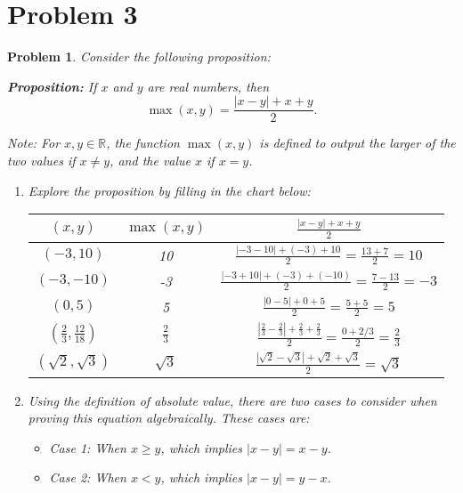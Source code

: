 \documentclass[12pt]{article}
\newtheorem{problem}{Problem}
\theoremstyle{definition}
\begin{document}
\bigskip

\section*{Problem 3}

\begin{problem}
Consider the following proposition:

\textbf{Proposition:} If \( x \) and \( y \) are real numbers, then
\[
\max(x, y) = \frac{|x - y| + x + y}{2}.
\]

Note: For \( x, y \in \mathbb{R} \), the function \( \max(x, y) \) is defined to output the larger of the two values if \( x \neq y \), and the value \( x \) if \( x = y \).

\begin{enumerate}[label=(\alph*)]

\item Explore the proposition by filling in the chart below:

\begin{center}
    \begin{tabular}{|c|c|c|}
    \hline
    \( (x, y) \) & \( \max(x, y) \) & \( \frac{|x - y| + x + y}{2} \) \\
    \hline
    \( (-3, 10) \) & 10 & \( \frac{| -3 - 10 | + (-3) + 10}{2} = \frac{13 + 7}{2} = 10 \) \\
    \( (-3, -10) \) & -3 & \( \frac{| -3 + 10 | + (-3) + (-10)}{2} = \frac{7 - 13}{2} = -3 \) \\
    \( (0, 5) \) & 5 & \( \frac{| 0 - 5 | + 0 + 5}{2} = \frac{5 + 5}{2} = 5 \) \\
    \( \left(\frac{2}{3}, \frac{12}{18}\right) \) & \( \frac{2}{3} \) & \( \frac{\left| \frac{2}{3} - \frac{2}{3} \right| + \frac{2}{3} + \frac{2}{3}}{2} = \frac{0 + 2/3}{2} = \frac{2}{3} \) \\
    \( (\sqrt{2}, \sqrt{3}) \) & \( \sqrt{3} \) & \( \frac{| \sqrt{2} - \sqrt{3} | + \sqrt{2} + \sqrt{3}}{2} = \sqrt{3} \) \\
    \hline
    \end{tabular}
\end{center}

\item Using the definition of absolute value, there are two cases to consider when proving this equation algebraically. These cases are:

\begin{itemize}
    \item Case 1: When \( x \geq y \), which implies \( |x - y| = x - y \).
    \item Case 2: When \( x < y \), which implies \( |x - y| = y - x \).
\end{itemize}


\end{enumerate}
\end{problem}
\end{document}
